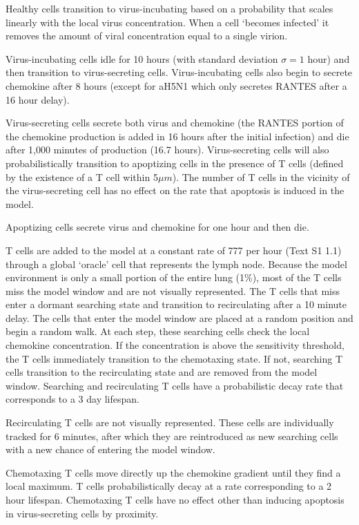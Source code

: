 \documentclass[10pt]{article}
\begin{document}
Healthy cells transition to virus-incubating based on a probability that scales linearly with the local virus concentration.   When a cell `becomes infected' it removes the amount of viral concentration equal to a single virion. 

Virus-incubating cells idle for 10 hours (with standard deviation $\sigma=1$ hour) and then transition to virus-secreting cells.  Virus-incubating cells also begin to secrete chemokine after 8 hours (except for aH5N1 which only secretes RANTES after a 16 hour delay).  

Virus-secreting cells secrete both virus and chemokine (the RANTES portion of the chemokine production is added in 16 hours after the initial infection) and die after 1,000 minutes of production (16.7 hours).  Virus-secreting cells will also probabilistically transition to apoptizing cells in the presence of T cells (defined by the existence of a T cell within 5$\mu m$).  The number of T cells in the vicinity of the virus-secreting cell has no effect on the rate that apoptosis is induced in the model.

Apoptizing cells secrete virus and chemokine for one hour and then die.

T cells are added to the model at a constant rate of 777 per hour (Text S1 1.1) through a global `oracle' cell that represents the lymph node.  Because the model environment is only a small portion of the entire lung (1\%), most of the T cells miss the model window and are not visually represented.  The T cells that miss enter a dormant searching state and transition to recirculating after a 10 minute delay.  The cells that enter the model window are placed at a random position and begin a random walk.  At each step, these searching cells check the local chemokine concentration.  If the concentration is above the sensitivity threshold, the T cells immediately transition to the chemotaxing state.  If not, searching T cells transition to the recirculating state and are removed from the model window.  Searching and recirculating T cells have a probabilistic decay rate that corresponds to a 3 day lifespan.

Recirculating T cells are not visually represented.  These cells are individually tracked for 6 minutes, after which they are reintroduced as new searching cells with a new chance of entering the model window.

Chemotaxing T cells move directly up the chemokine gradient until they find a local maximum.  T cells probabilistically decay at a rate corresponding to a 2 hour lifespan.  Chemotaxing T cells have no effect other than inducing apoptosis in virus-secreting cells by proximity.
\end{document}
